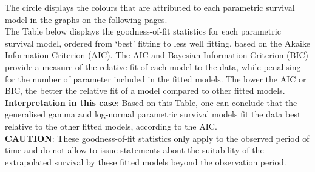 \documentclass[
]{article}
\begin{document}
The circle displays the colours that are attributed to each parametric
survival model in the graphs on the following pages.\\
The Table below displays the goodness-of-fit statistics for each
parametric survival model, ordered from `best' fitting to less well
fitting, based on the Akaike Information Criterion (AIC). The AIC and
Bayesian Information Criterion (BIC) provide a measure of the relative
fit of each model to the data, while penalising for the number of
parameter included in the fitted models. The lower the AIC or BIC, the
better the relative fit of a model compared to other fitted models.\\
\textbf{Interpretation in this case}: Based on this Table, one can
conclude that the generalised gamma and log-normal parametric survival
models fit the data best relative to the other fitted models, according
to the AIC.\\
\textbf{CAUTION}: These goodness-of-fit statistics only apply to the
observed period of time and do not allow to issue statements about the
suitability of the extrapolated survival by these fitted models beyond
the observation period.
\end{document}
